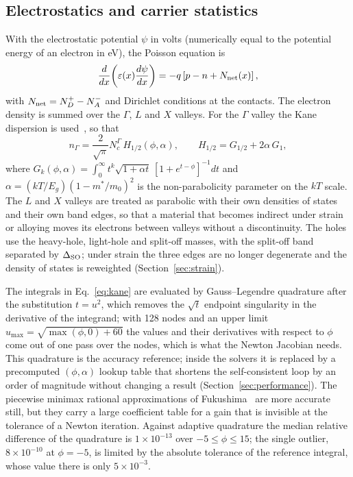 \documentclass[preprint,12pt]{elsarticle}
\begin{document}
\subsection{Electrostatics and carrier statistics}

With the electrostatic potential $\psi$ in volts (numerically equal to the
potential energy of an electron in eV), the Poisson equation is
\begin{equation}
  \frac{d}{dx}\!\left(\varepsilon(x)\frac{d\psi}{dx}\right)
  = -q\left[p - n + N_{\rm net}(x)\right],
  \label{eq:poisson}
\end{equation}
with $N_{\rm net}=N_D^{+}-N_A^{-}$ and Dirichlet conditions at the contacts.
The electron density is summed over the $\Gamma$, $L$ and $X$ valleys. For the
$\Gamma$ valley the Kane dispersion is used~\cite{Kane1957}, so that
\begin{equation}
  n_\Gamma = \frac{2}{\sqrt{\pi}}N_c^\Gamma\,
  H_{1/2}(\phi,\alpha), \qquad
  H_{1/2} = G_{1/2} + 2\alpha\,G_1,
  \label{eq:kane}
\end{equation}
where $G_k(\phi,\alpha)=\int_0^\infty t^k\sqrt{1+\alpha t}\,
[1+e^{t-\phi}]^{-1}dt$ and $\alpha=(kT/E_g)(1-m^{*}/m_0)^2$ is the
non-parabolicity parameter on the $kT$ scale. The $L$ and $X$ valleys are
treated as parabolic with their own densities of states and their own band
edges, so that a material that becomes indirect under strain or alloying moves
its electrons between valleys without a discontinuity. The holes use the
heavy-hole, light-hole and split-off masses, with the split-off band separated
by $\Delta_{\rm SO}$; under strain the three edges are no longer degenerate and
the density of states is reweighted (Section~\ref{sec:strain}).

The integrals in Eq.~\eqref{eq:kane} are evaluated by Gauss--Legendre
quadrature after the substitution $t=u^2$, which removes the $\sqrt{t}$
endpoint singularity in the derivative of the integrand; with 128 nodes and an
upper limit $u_{\max}=\sqrt{\max(\phi,0)+60}$ the values and their derivatives
with respect to $\phi$ come out of one pass over the nodes, which is what the
Newton Jacobian needs. This quadrature is the accuracy reference; inside the
solvers it is replaced by a precomputed $(\phi,\alpha)$ lookup table that
shortens the self-consistent loop by an order of magnitude without changing a
result (Section~\ref{sec:performance}). The piecewise minimax rational
approximations of Fukushima~\cite{Fukushima2015} are more accurate still, but
they carry a large coefficient table for a gain that is invisible at the
tolerance of a Newton iteration. Against adaptive quadrature the median
relative difference of the quadrature is $1\times10^{-13}$ over
$-5\le\phi\le15$; the single outlier, $8\times10^{-10}$ at $\phi=-5$, is
limited by the absolute tolerance of the reference integral, whose value there
is only $5\times10^{-3}$.
\end{document}
